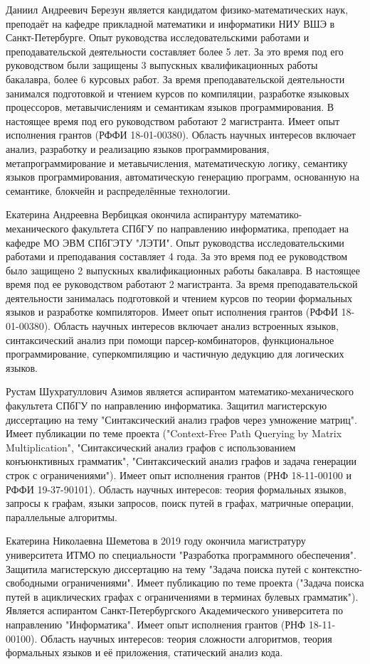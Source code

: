 \documentclass[12pt]{article}  %
\theoremstyle{remark}
\begin{document}
Даниил Андреевич Березун является кандидатом физико-математических наук, преподаёт на кафедре прикладной математики и информатики НИУ ВШЭ в Санкт-Петербурге.
Опыт руководства исследовательскими работами и преподавательской деятельности составляет более 5 лет.
За это время под его руководством были защищены 3 выпускных квалификационных работы бакалавра, более 6 курсовых работ.
За время преподавательской деятельности занимался подготовкой и чтением курсов по компиляции, разработке языковых процессоров, метавычислениям и семантикам языков программирования.
В настоящее время под его руководством работают 2 магистранта.
Имеет опыт исполнения грантов (РФФИ 18-01-00380).
Область научных интересов включает анализ, разработку и реализацию языков программирования,  метапрограммирование и метавычисления, математическую логику, семантику языков программирования,
автоматическую генерацию программ, основанную на семантике, блокчейн и распределённые технологии.

Екатерина Андреевна Вербицкая окончила аспирантуру математико-механического факультета СПбГУ по направлению информатика, преподает на кафедре МО ЭВМ СПбГЭТУ "ЛЭТИ".
Опыт руководства исследовательскими работами и преподавания составляет 4 года.
За это время под ее руководством было защищено 2 выпускных квалификационных работы бакалавра.
В настоящее время под ее руководством работают 2 магистранта.
За время преподавательской деятельности занималась подготовкой и чтением курсов по теории формальных языков и разработке компиляторов.
Имеет опыт исполнения грантов (РФФИ 18-01-00380).
Область научных интересов включает анализ встроенных языков, синтаксический анализ при помощи парсер-комбинаторов, функциональное программирование, суперкомпиляцию и частичную дедукцию для логических языков.

Рустам Шухратуллович Азимов является аспирантом математико-механического факультета СПбГУ по направлению информатика.
Защитил магистерскую диссертацию на тему "Синтаксический анализ графов через умножение матриц".
Имеет публикации по теме проекта ("Context-Free Path Querying by Matrix Multiplication", "Синтаксический анализ графов с использованием конъюнктивных грамматик", "Синтаксический анализ графов и задача генерации строк с ограничениями").
Имеет опыт исполнения грантов (РНФ 18-11-00100 и РФФИ 19-37-90101).
Область научных интересов: теория формальных языков, запросы к графам, языки запросов, поиск путей в графах, матричные операции, параллельные алгоритмы.

Екатерина Николаевна Шеметова в 2019 году окончила магистратуру университета ИТМО по специальности "Разработка программного обеспечения".
Защитила магистерскую диссертацию на тему "Задача поиска путей с контекстно-свободными ограничениями".
Имеет публикацию по теме проекта ("Задача поиска путей в ациклических графах с ограничениями в терминах булевых грамматик").
Является аспирантом Санкт-Петербургского Академического университета по направлению "Информатика". Имеет опыт исполнения грантов (РНФ 18-11-00100).
Область научных интересов: теория сложности алгоритмов, теория формальных языков и её приложения, статический анализ кода.
\end{document}
